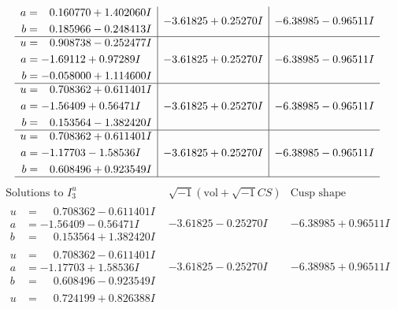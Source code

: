 \documentclass[1p]{elsarticle_modified}
\theoremstyle{definition}
\newcommand{\I}{\sqrt{-1}}
\begin{document}
$$\begin{array}{c|c|c}
\begin{aligned}
a &= \phantom{-}0.160770 + 1.402060 I \\
b &= \phantom{-}0.185966 - 0.248413 I\end{aligned}
 & -3.61825 + 0.25270 I & -6.38985 - 0.96511 I \\ \hline\begin{aligned}
u &= \phantom{-}0.908738 - 0.252477 I \\
a &= -1.69112 + 0.97289 I \\
b &= -0.058000 + 1.114600 I\end{aligned}
 & -3.61825 + 0.25270 I & -6.38985 - 0.96511 I \\ \hline\begin{aligned}
u &= \phantom{-}0.708362 + 0.611401 I \\
a &= -1.56409 + 0.56471 I \\
b &= \phantom{-}0.153564 - 1.382420 I\end{aligned}
 & -3.61825 + 0.25270 I & -6.38985 - 0.96511 I \\ \hline\begin{aligned}
u &= \phantom{-}0.708362 + 0.611401 I \\
a &= -1.17703 - 1.58536 I \\
b &= \phantom{-}0.608496 + 0.923549 I\end{aligned}
 & -3.61825 + 0.25270 I & -6.38985 - 0.96511 I\\
 \hline 
 \end{array}$$\newpage$$\begin{array}{c|c|c}  
\text{Solutions to }I^u_{3}& \I (\text{vol} + \sqrt{-1}CS) & \text{Cusp shape}\\
 \hline 
\begin{aligned}
u &= \phantom{-}0.708362 - 0.611401 I \\
a &= -1.56409 - 0.56471 I \\
b &= \phantom{-}0.153564 + 1.382420 I\end{aligned}
 & -3.61825 - 0.25270 I & -6.38985 + 0.96511 I \\ \hline\begin{aligned}
u &= \phantom{-}0.708362 - 0.611401 I \\
a &= -1.17703 + 1.58536 I \\
b &= \phantom{-}0.608496 - 0.923549 I\end{aligned}
 & -3.61825 - 0.25270 I & -6.38985 + 0.96511 I \\ \hline\begin{aligned}
u &= \phantom{-}0.724199 + 0.826388 I \\

\end{aligned}
\end{array}$$
\end{document}
